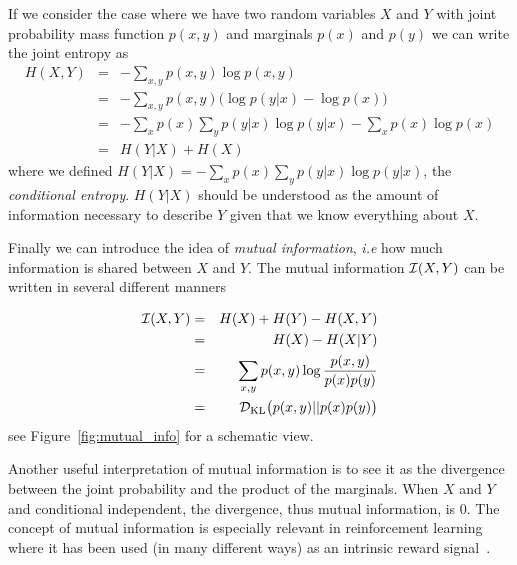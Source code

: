 If we consider the case where we have two random variables $X$ and $Y$ with joint probability mass function $p(x, y)$ and marginals $p(x)$ and $p(y)$ we can write the joint entropy as
\begin{eqnarray*}
H(X,Y) &=& - \sum_{x, y} p(x,y) \log p(x,y)\\ 
 &=& - \sum_{x, y} p(x,y) \big(\log p(y|x) - \log p(x) \big)\\ 
  &=& - \sum_x p(x) \sum_{y} p(y|x) \log p(y|x) - \sum_x p(x) \log p(x)\\ 
  &=& H(Y|X) + H(X)
\end{eqnarray*}
 where we defined $H(Y|X) = - \sum_x p(x) \sum_{y} p(y|x) \log p(y|x)$, the \emph{conditional entropy}. $H(Y|X)$ should be understood as the amount of information necessary to describe $Y$ given that we know everything about $X$.

Finally we can introduce the idea of \emph{mutual information}, \textit{i.e} how much information is shared between $X$ and $Y$.
The mutual information ${\mathcal{I}}(X, Y)$ can be written in several different manners

\begin{eqnarray*}
    {\mathcal{I}}(X, Y) &=& H(X) + H(Y) - H(X, Y)\\
    &=& H(X) - H(X|Y)\\
    &=& \sum_{x, y} p(x,y) \log \frac{p(x,y)}{p(x) p(y)}\\
    &=& {\mathcal{D}}_{\mathrm{KL}}\big(p(x,y)||p(x) p(y)\big)
\end{eqnarray*}
see Figure~\ref{fig:mutual_info} for a schematic view.

Another useful interpretation of mutual information is to see it as the divergence between the joint probability and the product of the marginals. When $X$ and $Y$ and conditional independent, the divergence, thus mutual information, is $0$. The concept of mutual information is especially relevant in reinforcement learning where it has been used (in many different ways) as an intrinsic reward signal~\citep{still2012information, mohamed2015variational, gregor2016variational, thomas2018disentangling, eysenbach2018diversity, eslami2018neural}.



